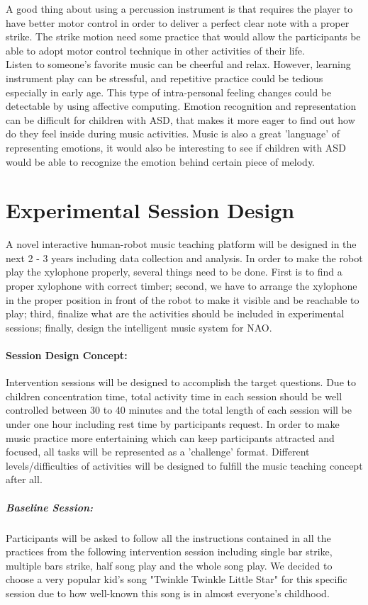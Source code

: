 \documentclass[12pt]{report}
\begin{document}
A good thing about using a percussion instrument is that requires the player to have better
motor control in order to deliver a perfect clear note with a proper strike. The strike motion
need some practice that would allow the participants be able to adopt motor control technique
in other activities of their life.\\

Listen to someone's favorite music can be cheerful and relax. However, learning instrument 
play can be stressful, and repetitive practice could be tedious especially in early age. This 
type of intra-personal feeling changes could be detectable by using affective computing. 
Emotion recognition and representation can be difficult for children with ASD, that makes 
it more eager to find out how do they feel inside during music activities. Music is also
a great 'language' of representing emotions, it would also be interesting to see if children
with ASD would be able to recognize the emotion behind certain piece of melody.

 
\section*{Experimental Session Design}
A novel interactive human-robot music teaching platform will be designed in 
the next 2 - 3 years including data collection and analysis. In order to make 
the robot play the xylophone properly, several things need 
to be done. First is to find a proper xylophone with correct timber; 
second, we have to arrange the xylophone in the proper position in front of the robot 
to make it visible and be reachable to play; third, finalize what are the activities 
should be included in experimental sessions; finally, design the intelligent music system for NAO.\\

\paragraph{Session Design Concept:}
Intervention sessions will be designed to accomplish the target questions. Due to children
concentration time, total activity time in each session should be well controlled between 
30 to 40 minutes and the total length of each session will be under one hour including rest
time by participants request. In order to make music practice more entertaining which can 
keep participants attracted and focused, all tasks will be represented as a 'challenge' format.
Different levels/difficulties of activities will be designed to fulfill the music teaching
concept after all. \\
\subparagraph{Baseline Session: }Participants will be asked to follow all the 
instructions contained in all the practices from the following intervention session 
including single bar strike, multiple bars strike, half song play and the whole
song play. We decided to choose a very popular kid's song "Twinkle Twinkle Little Star" 
for this specific session due to how well-known this song is in almost 
everyone's childhood.\\
\end{document}

